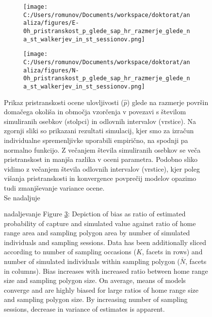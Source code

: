 \begin{figure}[H]
\centering
\begin{subfigure}[b]{0.8\textwidth}
  \centering
  \texttt{[image: C:/Users/romunov/Documents/workspace/doktorat/analiza/figures/E-0h\_pristranskost\_p\_glede\_sap\_hr\_razmerje\_glede\_na\_st\_walkerjev\_in\_st\_sessionov.png]}
  \label{sli:sub6.1}
\end{subfigure}

\begin{subfigure}[b]{0.8\textwidth}
  \centering
  \texttt{[image: C:/Users/romunov/Documents/workspace/doktorat/analiza/figures/N-0h\_pristranskost\_p\_glede\_sap\_hr\_razmerje\_glede\_na\_st\_walkerjev\_in\_st\_sessionov.png]}
  \label{sli:sub6.2}
\end{subfigure}
\caption[Prikaz pristranskosti ocene ulovljivosti glede na razmerje površin domačega okoliša in območja vzorčenja v povezavi s številom simuliranih osebkov in odlovnih intervalov]{Prikaz pristranskosti ocene ulovljivosti ($\hat{p}$) glede na razmerje površin domačega okoliša in območja vzorčenja v povezavi s številom simuliranih osebkov (stolpci) in odlovnih intervalov (vrstice). Na zgornji sliki so prikazani rezultati simulacij, kjer smo za izračun individualne spremenljivke uporabili empirično, na spodnji pa normalno funkcijo. Z večanjem števila simuliranih osebkov se veča pristranskost in manjša razlika v oceni parametra. Podobno sliko vidimo z večanjem števila odlovnih intervalov (vrstice), kjer poleg višanja pristranskosti in konvergence povprečij modelov opazimo tudi zmanjševanje variance ocene.\\
Se nadaljuje
}
\label{sli:slika6}
\end{figure}

\begin{figure}\ContinuedFloat
\caption*{nadaljevanje Figure \ref{sli:slika6}: Depiction of bias as ratio of estimated probability of capture and simulated value against ratio of home range area and sampling polygon area by number of simulated individuals and sampling sessions. Data has been additionally sliced according to number of sampling occasions ($K$, facets in rows) and number of simulated individuals within sampling polygon ($\bar{N}$, facets in columns). Bias increases with increased ratio between home range size and sampling polygon size. On average, means of models converge and are highly biased for large ratios of home range size and sampling polygon size. By increasing number of sampling sessions, decrease in variance of estimates is apparent.}
\end{figure}

